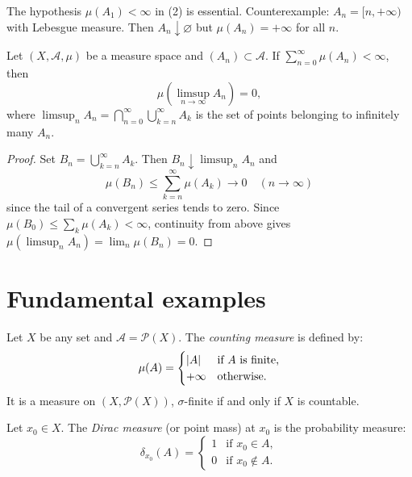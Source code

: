 \begin{warning}[title=\textbf{Finiteness condition}]
The hypothesis $\mu(A_1) < \infty$ in (2) is essential. Counterexample:
$A_n = [n, +\infty)$ with Lebesgue measure. Then $A_n \downarrow \varnothing$ but
$\mu(A_n) = +\infty$ for all $n$.
\end{warning}

\begin{lemma}
\label{lem:borel_cantelli}
Let $(X, \mathcal{A}, \mu)$ be a measure space and $(A_n) \subset \mathcal{A}$. If
$\sum_{n=0}^{\infty} \mu(A_n) < \infty$, then
\[
\mu\!\left(\limsup_{n \to \infty} A_n\right) = 0,
\]
where $\limsup_n A_n = \bigcap_{n=0}^{\infty} \bigcup_{k=n}^{\infty} A_k$ is the
set of points belonging to infinitely many $A_n$.
\end{lemma}

\begin{proof}
Set $B_n = \bigcup_{k=n}^{\infty} A_k$. Then $B_n \downarrow \limsup_n A_n$ and
\[
\mu(B_n) \leq \sum_{k=n}^{\infty} \mu(A_k) \to 0 \quad (n \to \infty)
\]
since the tail of a convergent series tends to zero. Since $\mu(B_0) \leq
\sum_k \mu(A_k) < \infty$, continuity from above gives
$\mu(\limsup_n A_n) = \lim_n \mu(B_n) = 0$.
\end{proof}

\section{Fundamental examples}

\begin{example}
Let $X$ be any set and $\mathcal{A} = \mathcal{P}(X)$. The \emph{counting measure}
is defined by:
\[
\mu(A) = \begin{cases} \left| A \right| & \text{if } A \text{ is finite,} \\
+\infty & \text{otherwise.} \end{cases}
\]
It is a measure on $(X, \mathcal{P}(X))$, $\sigma$-finite if and only if $X$ is
countable.
\end{example}

\begin{example}
Let $x_0 \in X$. The \emph{Dirac measure} (or point mass) at $x_0$ is the
probability measure:
\[
\delta_{x_0}(A) = \begin{cases} 1 & \text{if } x_0 \in A, \\ 0 & \text{if }
x_0 \notin A. \end{cases}
\]
\end{example}

